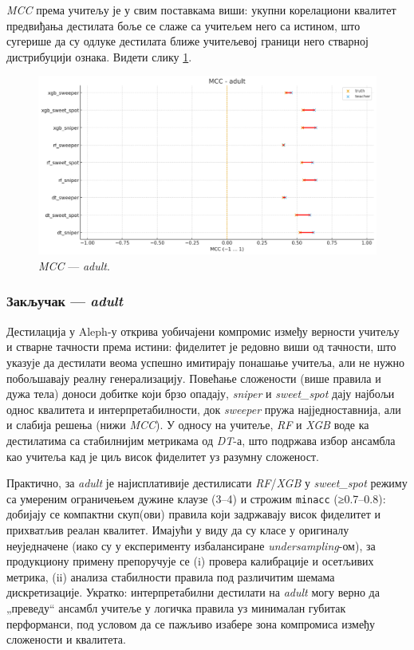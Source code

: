 \textit{MCC} према учитељу је у свим поставкама виши: укупни корелациони квалитет предвиђања дестилата боље се слаже са учитељем него са истином, што сугерише да су одлуке дестилата ближе учитељевој граници него стварној дистрибуцији ознака. Видети слику \ref{fig:adult-mcc-tt}.
\begin{figure}[H]
  \centering
  \includegraphics[width=.85\linewidth]{images/charts/mcc_simple_adult.png}
  \caption{\textit{MCC} — \textit{adult}.}
  \label{fig:adult-mcc-tt}
\end{figure}

\subsubsection*{Закључак — \textit{adult}}
Дестилација у Aleph-у открива уобичајени компромис између верности учитељу и стварне тачности према истини: фиделитет је редовно виши од тачности, што указује да дестилати веома успешно имитирају понашање учитеља, али не нужно побољшавају реалну генерализацију. Повећање сложености (више правила и дужа тела) доноси добитке који брзо опадају, \textit{sniper} и \textit{sweet\_spot} дају најбољи однос квалитета и интерпретабилности, док \textit{sweeper} пружа најједноставнија, али и слабија решења (нижи \textit{MCC}). У односу на учитеље, \textit{RF} и \textit{XGB} воде ка дестилатима са стабилнијим метрикама од \textit{DT}-а, што подржава избор ансамбла као учитеља кад је циљ висок фиделитет уз разумну сложеност.

Практично, за \textit{adult} је најисплативије дестилисати \textit{RF}/\textit{XGB} у \textit{sweet\_spot} режиму са умереним ограничењем дужине клаузе (3–4) и строжим \texttt{minacc} (≥0.7–0.8): добијају се компактни скуп(ови) правила који задржавају висок фиделитет и прихватљив реалан квалитет. Имајући у виду да су класе у оригиналу неуједначене (иако су у експерименту избалансиране \textit{undersampling}-ом), за продукциону примену препоручује се (i) провера калибрације и осетљивих метрика, (ii) анализа стабилности правила под различитим шемама дискретизације. Укратко: интерпретабилни дестилати на \textit{adult} могу верно да „преведу“ ансамбл учитеље у логичка правила уз минималан губитак перформанси, под условом да се пажљиво изабере зона компромиса између сложености и квалитета.

